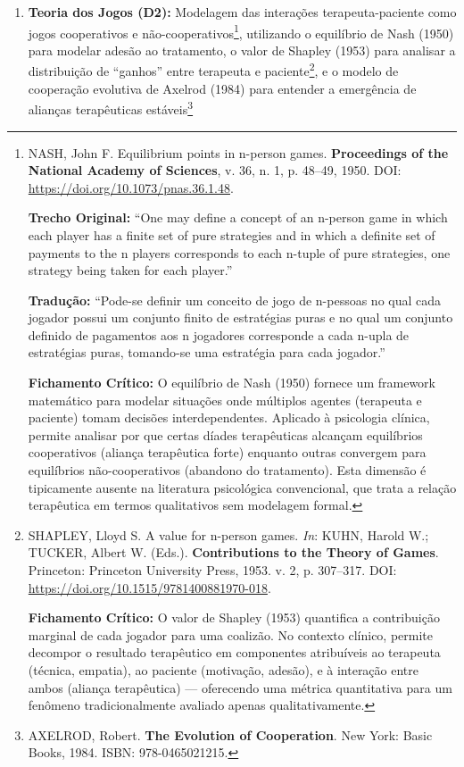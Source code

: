 \begin{enumerate}
  \item \textbf{Teoria dos Jogos (D2):} Modelagem das interações terapeuta-paciente como jogos cooperativos e não-cooperativos\footnote{
    NASH, John F. Equilibrium points in n-person games. \textbf{Proceedings of the National Academy of Sciences}, v. 36, n. 1, p. 48--49, 1950. DOI: \url{https://doi.org/10.1073/pnas.36.1.48}.

    \textbf{Trecho Original:} ``One may define a concept of an n-person game in which each player has a finite set of pure strategies and in which a definite set of payments to the n players corresponds to each n-tuple of pure strategies, one strategy being taken for each player.''

    \textbf{Tradução:} ``Pode-se definir um conceito de jogo de n-pessoas no qual cada jogador possui um conjunto finito de estratégias puras e no qual um conjunto definido de pagamentos aos n jogadores corresponde a cada n-upla de estratégias puras, tomando-se uma estratégia para cada jogador.''

    \textbf{Fichamento Crítico:} O equilíbrio de Nash (1950) fornece um framework matemático para modelar situações onde múltiplos agentes (terapeuta e paciente) tomam decisões interdependentes. Aplicado à psicologia clínica, permite analisar por que certas díades terapêuticas alcançam equilíbrios cooperativos (aliança terapêutica forte) enquanto outras convergem para equilíbrios não-cooperativos (abandono do tratamento). Esta dimensão é tipicamente ausente na literatura psicológica convencional, que trata a relação terapêutica em termos qualitativos sem modelagem formal.
  }, utilizando o equilíbrio de Nash (1950) para modelar adesão ao tratamento, o valor de Shapley (1953) para analisar a distribuição de ``ganhos'' entre terapeuta e paciente\footnote{
    SHAPLEY, Lloyd S. A value for n-person games. \textit{In}: KUHN, Harold W.; TUCKER, Albert W. (Eds.). \textbf{Contributions to the Theory of Games}. Princeton: Princeton University Press, 1953. v. 2, p. 307--317. DOI: \url{https://doi.org/10.1515/9781400881970-018}.

    \textbf{Fichamento Crítico:} O valor de Shapley (1953) quantifica a contribuição marginal de cada jogador para uma coalizão. No contexto clínico, permite decompor o resultado terapêutico em componentes atribuíveis ao terapeuta (técnica, empatia), ao paciente (motivação, adesão), e à interação entre ambos (aliança terapêutica) --- oferecendo uma métrica quantitativa para um fenômeno tradicionalmente avaliado apenas qualitativamente.
  }, e o modelo de cooperação evolutiva de Axelrod (1984) para entender a emergência de alianças terapêuticas estáveis\footnote{
    AXELROD, Robert. \textbf{The Evolution of Cooperation}. New York: Basic Books, 1984. ISBN: 978-0465021215.

}
\end{enumerate}
